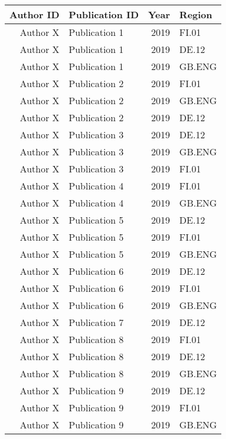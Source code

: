 \begin{tabular}{rlrl}
\hline
   Author ID & Publication ID     &   Year & Region   \\
\hline
Author X & Publication 1 &   2019 & FI.01    \\
Author X & Publication 1 &   2019 & DE.12    \\
Author X & Publication 1 &   2019 & GB.ENG   \\
Author X & Publication 2 &   2019 & FI.01    \\
Author X & Publication 2 &   2019 & GB.ENG   \\
Author X & Publication 2 &   2019 & DE.12    \\
Author X & Publication 3 &   2019 & DE.12    \\
Author X & Publication 3 &   2019 & GB.ENG   \\
Author X & Publication 3 &   2019 & FI.01    \\
Author X & Publication 4 &   2019 & FI.01    \\
Author X & Publication 4 &   2019 & GB.ENG   \\
Author X & Publication 5 &   2019 & DE.12    \\
Author X & Publication 5 &   2019 & FI.01    \\
Author X & Publication 5 &   2019 & GB.ENG   \\
Author X & Publication 6 &   2019 & DE.12    \\
Author X & Publication 6 &   2019 & FI.01    \\
Author X & Publication 6 &   2019 & GB.ENG   \\
Author X & Publication 7 &   2019 & DE.12    \\
Author X & Publication 8 &   2019 & FI.01    \\
Author X & Publication 8 &   2019 & DE.12    \\
Author X & Publication 8 &   2019 & GB.ENG   \\
Author X & Publication 9 &   2019 & DE.12    \\
Author X & Publication 9 &   2019 & FI.01    \\
Author X & Publication 9 &   2019 & GB.ENG   \\
\hline
\end{tabular}